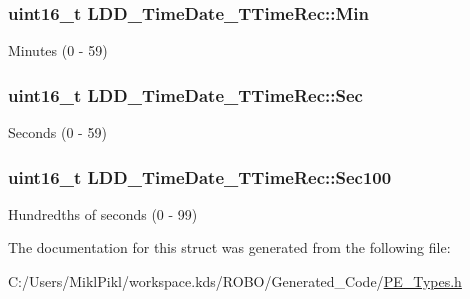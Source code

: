 \subsubsection[{Min}]{\setlength{\rightskip}{0pt plus 5cm}uint16\+\_\+t L\+D\+D\+\_\+\+Time\+Date\+\_\+\+T\+Time\+Rec\+::\+Min}\label{struct_l_d_d___time_date___t_time_rec_a7cea2c409e90bccdc33f19b093020373}
Minutes (0 -\/ 59) \hypertarget{struct_l_d_d___time_date___t_time_rec_a05cccc86e89e5704b0460caaf2429f75}{}
\subsubsection[{Sec}]{\setlength{\rightskip}{0pt plus 5cm}uint16\+\_\+t L\+D\+D\+\_\+\+Time\+Date\+\_\+\+T\+Time\+Rec\+::\+Sec}\label{struct_l_d_d___time_date___t_time_rec_a05cccc86e89e5704b0460caaf2429f75}
Seconds (0 -\/ 59) \hypertarget{struct_l_d_d___time_date___t_time_rec_a2cd2e13e7c478f04ea1c4c460b104491}{}
\subsubsection[{Sec100}]{\setlength{\rightskip}{0pt plus 5cm}uint16\+\_\+t L\+D\+D\+\_\+\+Time\+Date\+\_\+\+T\+Time\+Rec\+::\+Sec100}\label{struct_l_d_d___time_date___t_time_rec_a2cd2e13e7c478f04ea1c4c460b104491}
Hundredths of seconds (0 -\/ 99) 

The documentation for this struct was generated from the following file\+:\begin{DoxyCompactItemize}
\item 
C\+:/\+Users/\+Mikl\+Pikl/workspace.\+kds/\+R\+O\+B\+O/\+Generated\+\_\+\+Code/\hyperlink{_p_e___types_8h}{P\+E\+\_\+\+Types.\+h}\end{DoxyCompactItemize}
